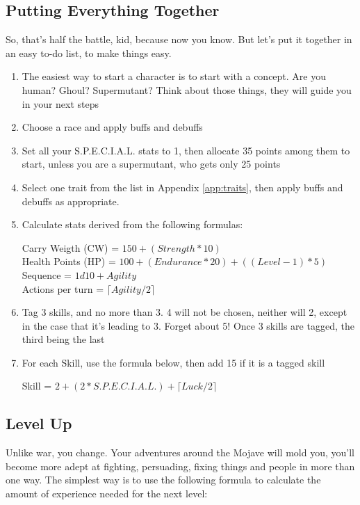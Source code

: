 \documentclass[11pt]{article} %
\begin{document}
\subsection{Putting Everything Together}

So, that's half the battle, kid, because now you know. But let's put it together in an easy to-do list, to make things easy.

\begin{enumerate}
\item The easiest way to start a character is to start with a concept. Are you human? Ghoul? Supermutant? Think about those things, they will guide you in your next steps
\item Choose a race and apply buffs and debuffs
\item Set all your S.P.E.C.I.A.L. stats to 1, then allocate 35 points among them to start, unless you are a supermutant, who gets only 25 points
\item Select one trait from the list in Appendix \ref{app:traits}, then apply buffs and debuffs as appropriate. 
\item Calculate stats derived from the following formulas:
\begin{center}
Carry Weigth (CW) = $150 + (Strength * 10)$ \\
Health Points (HP) = $100 + (Endurance * 20) + ((Level - 1) * 5)$ \\
Sequence = $1d10 + Agility$ \\
Actions per turn = $ \lceil Agility / 2 \rceil $
\end{center}
\item Tag 3 skills, and no more than 3. 4 will not be chosen, neither will 2, except in the case that it's leading to 3. Forget about 5! Once 3 skills are tagged, the third being the last
\item For each Skill, use the formula below, then add 15 if it is a tagged skill
\begin{center}
Skill = $2 + (2 * S.P.E.C.I.A.L.) + \lceil Luck / 2 \rceil$
\end{center}

\end{enumerate}

\subsection{Level Up} 

Unlike war, you change. Your adventures around the Mojave will mold you, you'll become more adept at fighting, persuading, fixing things and people in more than one way. The simplest way is to use the following formula to calculate the amount of experience needed for the next level: 
\end{document}
